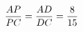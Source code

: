 \documentclass[preview]{standalone}
\begin{document}
\begin{align*}
\special{dvisvgm:raw <g id='unique000'>}\frac{AP}{PC}=\frac{AD}{DC}=\frac{8}{15}\special{dvisvgm:raw </g>}
\end{align*}
\end{document}

